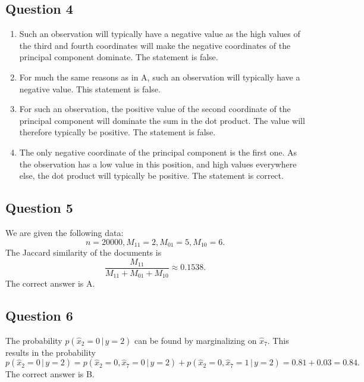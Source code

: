 \documentclass[twoside,11pt]{article}
\begin{document}
\subsection*{Question 4}

\begin{enumerate}[label=\Alph*.]
	\item Such an observation will typically have a negative value as the high values of the third and fourth coordinates will make the negative coordinates of the principal component dominate. The statement is false.

	\item For much the same reasons as in A, such an observation will typically have a negative value. This statement is false.

	\item For such an observation, the positive value of the second coordinate of the principal component will dominate the sum in the dot product. The value will therefore typically be positive. The statement is false.

	\item The only negative coordinate of the principal component is the first one. As the observation has a low value in this position, and high values everywhere else, the dot product will typically be positive. The statement is correct.
	\end{enumerate}

\subsection*{Question 5}

We are given the following data:
\[
	n = 20000, M_{11} = 2, M_{01} = 5, M_{10} = 6.
\]
The Jaccard similarity of the documents is
\[
	\frac{M_{11}}{M_{11} + M_{01} + M_{10}} \approx 0.1538.
\]
The correct answer is A.

\subsection*{Question 6}

The probability \(p(\hat{x}_2 = 0 \, | \, y = 2)\) can be found by marginalizing on \(\hat{x}_7\). This results in the probability
\[
	p(\hat{x}_2 = 0 \, | \, y = 2) = p(\hat{x}_2 = 0, \hat{x}_7 = 0 \, | \, y = 2)
	+ p(\hat{x}_2 = 0, \hat{x}_7 = 1 \, | \, y = 2) = 0.81 + 0.03 = 0.84.
\]
The correct answer is B.
\end{document}
